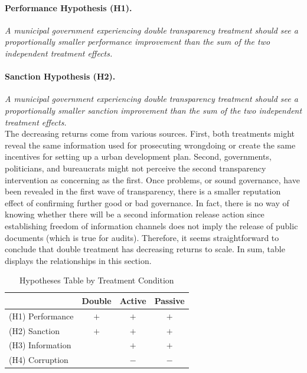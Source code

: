 \documentclass[11pt]{article}
\newcommand{\T}{\rule{0pt}{2.6ex}}            %
\newcommand{\B}{\rule[-1.2ex]{0pt}{0pt}}      %
\begin{document}
\paragraph{Performance Hypothesis (H1).} \emph{A municipal government experiencing double transparency treatment should see a proportionally smaller performance improvement than the sum of the two independent treatment effects.}

\paragraph{Sanction Hypothesis (H2).} \emph{A municipal government experiencing double transparency treatment should see a proportionally smaller sanction improvement than the sum of the two independent treatment effects.} \\

The decreasing returns come from various sources. First, both treatments might reveal the same information used for prosecuting wrongdoing or create the same incentives for setting up a urban development plan. Second, governments, politicians, and bureaucrats might not perceive the second transparency intervention as concerning as the first. Once problems, or sound governance, have been revealed in the first wave of transparency, there is a smaller reputation effect of confirming further good or bad governance. In fact, there is no way of knowing whether there will be a second information release action since establishing freedom of information channels does not imply the release of public documents (which is true for audits). Therefore, it seems straightforward to conclude that double treatment has decreasing returns to scale. In sum, table displays the relationships in this section.
\clearpage
\begin{table}[!htbp]
  \caption{Hypotheses Table by Treatment Condition}
  \label{tab:hypotheses3}
  \centering
  \scriptsize
  \begin{tabular}{l|p{1.5cm}|p{1.5cm}|p{1.5cm}}
  \hline
  \hline
                   & \multicolumn{1}{c}{Double}& \multicolumn{1}{c}{Active}& \multicolumn{1}{c}{Passive} \T \B \\
  \hline
  (H1) Performance & \multicolumn{1}{c}{$+$}   & \multicolumn{1}{c}{$+$}   & \multicolumn{1}{c}{$+$}     \T \B \\
  (H2) Sanction    & \multicolumn{1}{c}{$+$}   & \multicolumn{1}{c}{$+$}   & \multicolumn{1}{c}{$+$}     \T \B \\
  (H3) Information & \multicolumn{1}{c}{}      & \multicolumn{1}{c}{$+$}   & \multicolumn{1}{c}{$+$}     \T \B \\
  (H4) Corruption  & \multicolumn{1}{c}{}      & \multicolumn{1}{c}{$-$}   & \multicolumn{1}{c}{$-$}     \T \B \\
  \hline
  \hline
  \end{tabular}
\end{table}
\end{document}
